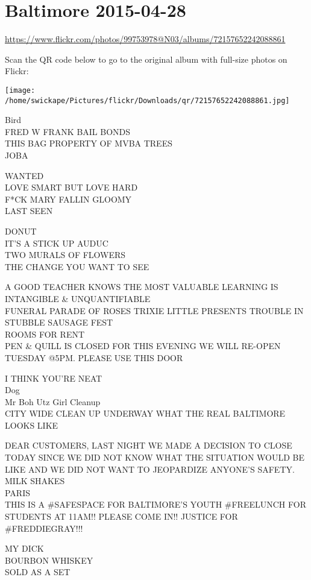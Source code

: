 \documentclass[10pt,letterpaper]{article}
\begin{document}
\section*{Baltimore 2015-04-28}

\url{https://www.flickr.com/photos/99753978@N03/albums/72157652242088861}

Scan the QR code below to go to the original album with full-size photos on Flickr:

\texttt{[image: /home/swickape/Pictures/flickr/Downloads/qr/72157652242088861.jpg]}


Bird\\
FRED W FRANK BAIL BONDS\\
THIS BAG PROPERTY OF MVBA TREES\\
JOBA

WANTED\\
LOVE SMART BUT LOVE HARD\\
F*CK MARY FALLIN GLOOMY\\
LAST SEEN

DONUT\\
IT'S A STICK UP AUDUC\\
TWO MURALS OF FLOWERS\\
THE CHANGE YOU WANT TO SEE

A GOOD TEACHER KNOWS THE MOST VALUABLE LEARNING IS INTANGIBLE \& UNQUANTIFIABLE\\
FUNERAL PARADE OF ROSES TRIXIE LITTLE PRESENTS TROUBLE IN STUBBLE SAUSAGE FEST\\
ROOMS FOR RENT\\
PEN \& QUILL IS CLOSED FOR THIS EVENING WE WILL RE{-}OPEN TUESDAY @5PM.  PLEASE USE THIS DOOR

I THINK YOU'RE NEAT\\
Dog\\
Mr Boh Utz Girl Cleanup\\
CITY WIDE CLEAN UP UNDERWAY WHAT THE REAL BALTIMORE LOOKS LIKE

DEAR CUSTOMERS, LAST NIGHT WE MADE A DECISION TO CLOSE TODAY SINCE WE DID NOT KNOW WHAT THE SITUATION WOULD BE LIKE AND WE DID NOT WANT TO JEOPARDIZE ANYONE'S SAFETY.\\
MILK SHAKES\\
PARIS\\
THIS IS A \#SAFESPACE FOR BALTIMORE'S YOUTH \#FREELUNCH FOR STUDENTS AT 11AM!!  PLEASE COME IN!!  JUSTICE FOR \#FREDDIEGRAY!!!

MY DICK\\
BOURBON WHISKEY\\
SOLD AS A SET
\end{document}

